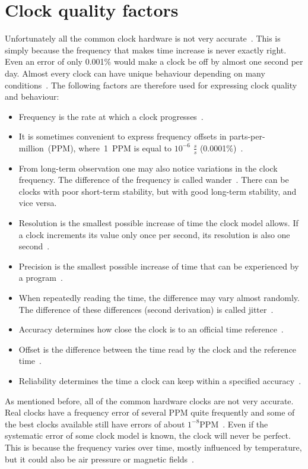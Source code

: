 \section{Clock quality factors}
Unfortunately all the common clock hardware is not very accurate~\cite{ntp-faq}.
This is simply because the frequency that makes time increase is never exactly right.
Even an error of only 0.001\% would make a clock be off by almost one second per day.
Almost every clock can have unique behaviour depending on many conditions~\cite{ntp-faq}.
The following factors are therefore used for expressing clock quality and behaviour:
\begin{itemize}
\item
Frequency is the rate at which a clock progresses~\cite{thesis-sync}.
\item
It is sometimes convenient
to express frequency offsets in parts-per-million~(PPM), where~1~PPM
is equal to $10^{-6}$ $\frac{s}{s}$ (0.0001\%)~\cite{rfc5905}.
\item
From long-term observation one may also notice variations in the clock frequency.
The difference of the frequency is called wander~\cite{ntp-faq}.
There can be clocks with poor short-term stability, but with good long-term stability, and vice versa.
\item
Resolution is the smallest possible increase of time the clock model allows.
If a clock increments its value only once per second, its resolution is also one second~\cite{ntp-faq}.
\item
Precision is the smallest possible increase of time that can be experienced
by a program~\cite{ntp-faq}.
\item
When repeatedly reading the time, the difference may vary almost randomly.
The difference of these differences (second derivation) is called jitter~\cite{ntp-faq}.
\item
Accuracy determines how close the clock is to an official time reference~\cite{ntp-faq}.
\item
Offset is the difference between the time read by the clock and the reference time~\cite{thesis-sync}.
\item
Reliability determines the time a clock can keep within a specified accuracy~\cite{ntp-faq}.
\end{itemize}

As mentioned before, all of the common hardware clocks are not very accurate.
Real clocks have a frequency error of several PPM quite frequently
and some of the best clocks available still have errors of about $1^{-8}$PPM~\cite{ntp-faq}.
Even if the systematic error of some clock model is known, the clock will never be perfect.
This is because the frequency varies over time, mostly influenced by temperature,
but it could also be air pressure or magnetic fields~\cite{ntp-faq}.

